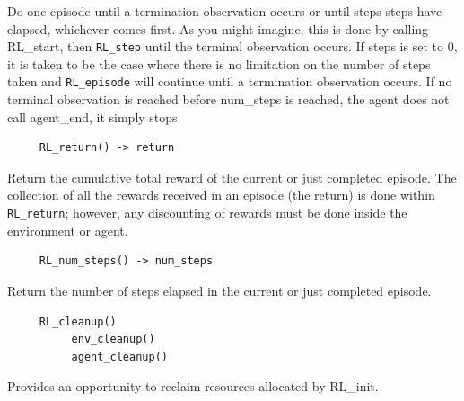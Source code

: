 \documentclass[11pt]{article}
\begin{document}
Do one episode until a termination observation occurs or until steps steps have elapsed, whichever comes first.  As you might imagine, this is done by calling RL\_start, then \texttt{RL\_step} until the terminal observation occurs.  If steps is set to 0, it is taken to be the case where there is no limitation on the number of steps taken and \texttt{RL\_episode} will continue until a termination observation occurs. If no terminal observation is reached before num\_steps is reached, the agent does not call agent\_end, it simply stops.
\begin{verbatim}
     RL_return() -> return
\end{verbatim}
Return the cumulative total reward of the current or just completed episode.  The collection of all the rewards received in an episode (the return) is done within \texttt{RL\_return}; however, any discounting of rewards must be done inside the environment or agent.
\begin{verbatim}
     RL_num_steps() -> num_steps
\end{verbatim}
Return the number of steps elapsed in the current or just completed episode.
\begin{verbatim}
     RL_cleanup()
          env_cleanup()
          agent_cleanup()
\end{verbatim}
Provides an opportunity to reclaim resources allocated by RL\_init.
\end{document}
